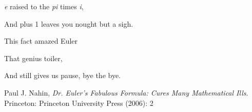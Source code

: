 \documentclass[12pt]{article}
\begin{document}
{\it e} raised to the {\it pi} times {\it i},

And plus 1 leaves you nought but a sigh.

This fact amazed Euler

That genius toiler,

And still gives us pause, bye the bye.

\begin{thebibliography}{1}
 Paul J. Nahin, {\it Dr. Euler's Fabulous Formula: Cures Many Mathematical Ills}. Princeton: Princeton University Press (2006): 2
\end{thebibliography}
\end{document}
